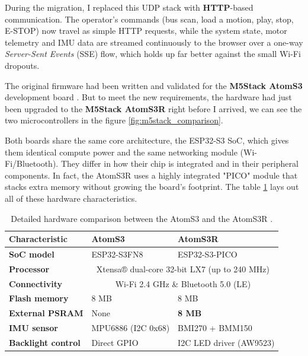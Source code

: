 \documentclass{tropLaClasse}
\begin{document}
During the migration, I replaced this UDP stack with \textbf{HTTP}-based communication. The operator's commands (bus scan, load a motion, play, stop, E-STOP) now travel as simple HTTP requests, while the system state, motor telemetry and IMU data are streamed continuously to the browser over a one-way \textit{Server-Sent Events} (SSE) flow, which holds up far better against the small Wi-Fi dropouts.

The original firmware had been written and validated for the \textbf{M5Stack AtomS3} development board \cite{m5stack_atoms3}. But to meet the new requirements, the hardware had just been upgraded to the \textbf{M5Stack AtomS3R} \cite{m5stack_atoms3r} right before I arrived, we can see the two microcontrollers in the figure \ref{fig:m5stack_comparison}. \label{text:m5stack_comparison}



Both boards share the same core architecture, the ESP32-S3 SoC, which gives them identical compute power and the same networking module (Wi-Fi/Bluetooth). They differ in how their chip is integrated and in their peripheral components. In fact, the AtomS3R uses a highly integrated "PICO" module that stacks extra memory without growing the board's footprint. The table \ref{tab:m5stack_diff} lays out all of these hardware characteristics.

\begin{table}[H]
\centering
\begin{tabular}{|l|l|l|}
\hline
\textbf{Characteristic} & \textbf{AtomS3} & \textbf{AtomS3R} \\
\hline
\textbf{SoC model} & ESP32-S3FN8 & ESP32-S3-PICO \\
\hline
\textbf{Processor} & \multicolumn{2}{c|}{Xtensa® dual-core 32-bit LX7 (up to 240 MHz)} \\
\hline
\textbf{Connectivity} & \multicolumn{2}{c|}{Wi-Fi 2.4 GHz \& Bluetooth 5.0 (LE)} \\
\hline
\textbf{Flash memory} & 8 MB & 8 MB \\
\hline
\textbf{External PSRAM} & None & \textbf{8 MB} \\
\hline
\textbf{IMU sensor} & MPU6886 (I2C 0x68) & BMI270 + BMM150 \\
\hline
\textbf{Backlight control} & Direct GPIO & I2C LED driver (AW9523) \\
\hline
\end{tabular}
\caption{Detailed hardware comparison between the AtomS3 and the AtomS3R \cite{m5stack_atoms3, m5stack_atoms3r}.}
\label{tab:m5stack_diff}
\end{table}
\end{document}
